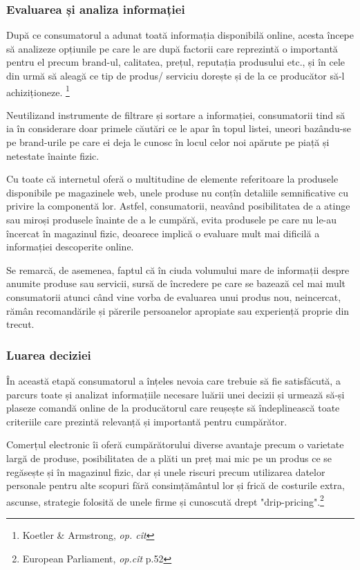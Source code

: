 \documentclass[a4paper, 12pt]{article}
\begin{document}
		\subsubsection{Evaluarea și analiza informației }
		
		\quad\quad După ce consumatorul a adunat toată informația disponibilă online, acesta începe să analizeze opțiunile pe care le are după factorii care reprezintă o importantă pentru el precum brand-ul, calitatea, prețul, reputația produsului etc., și în cele din urmă să aleagă ce tip de produs/ serviciu dorește și de la ce producător să-l achiziționeze. \footnote{Koetler \& Armstrong, \textit{op. cît}}
		
		\quad Neutilizand instrumente de filtrare și sortare a informației, consumatorii tind să ia în considerare doar primele căutări ce le apar în topul listei, uneori bazându-se pe brand-urile pe care ei deja le cunosc în locul celor noi apărute pe piață și netestate înainte fizic.
		
		\quad Cu toate că internetul oferă o multitudine de elemente referitoare la produsele disponibile pe magazinele web, unele produse nu conțîn detaliile semnificative cu privire la componentă lor. Astfel, consumatorii, neavând posibilitatea de a atinge sau miroși produsele înainte de a le cumpără, evita produsele pe care nu le-au încercat în magazinul fizic, deoarece implică o evaluare mult mai dificilă a informației descoperite online.
		
		\quad Se remarcă, de asemenea, faptul că în ciuda volumului mare de informații despre anumite produse sau servicii, sursă de încredere pe care se bazează cel mai mult consumatorii atunci când vine vorba de evaluarea unui produs nou, neincercat, rămân recomandările și părerile persoanelor apropiate sau experiență proprie din trecut.
		
		
		\subsubsection{Luarea deciziei}
		
		\quad\quad În această etapă consumatorul a înțeles nevoia care trebuie să fie satisfăcută, a parcurs toate și analizat informațiile necesare luării unei decizii și urmează să-și plaseze comandă online de la producătorul care reușește să îndeplinească toate criteriile care prezintă relevanță și importantă pentru cumpărător.
		
		\quad  Comerțul electronic îi oferă cumpărătorului diverse avantaje precum o varietate largă de produse, posibilitatea de a plăti un preț mai mic pe un produs ce se regăsește și în magazinul fizic, dar și unele riscuri precum utilizarea datelor personale pentru alte scopuri  fără consimțământul lor și frică de costurile extra, ascunse, strategie folosită de unele firme și cunoscută drept "drip-pricing".\footnote{European Parliament, \textit{op.cît} p.52}
		
\end{document}
